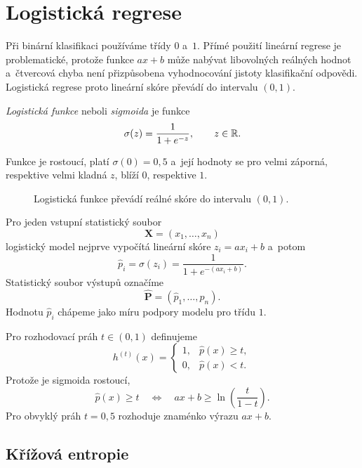 \section{Logistická regrese}\label{sec:ai-logisticka-regrese}

Při binární klasifikaci používáme třídy \(0\) a~\(1\). Přímé použití lineární regrese je problematické, protože funkce \(ax+b\) může nabývat libovolných reálných hodnot a~čtvercová chyba není přizpůsobena vyhodnocování jistoty klasifikační odpovědi. Logistická regrese proto lineární skóre převádí do intervalu \((0,1)\).

\begin{definition}\label{def:ai-sigmoida}
    \emph{Logistická funkce} neboli \emph{sigmoida} je funkce
    \[
        \sigma(z)
        =
        \frac{1}{1+e^{-z}},
        \qquad z\in\mathbb{R}.
    \]
\end{definition}

Funkce je rostoucí, platí \(\sigma(0)=0{,}5\) a~její hodnoty se pro velmi záporná, respektive velmi kladná \(z\), blíží \(0\), respektive \(1\).

\begin{figure}[ht]
    \centering
    
    \caption{Logistická funkce převádí reálné skóre do intervalu \((0,1)\).}
    \label{fig:ai-sigmoida}
\end{figure}

Pro jeden vstupní statistický soubor
\[
    \mathbf{X}=(x_1,\ldots,x_n)
\]
logistický model nejprve vypočítá lineární skóre \(z_i=ax_i+b\) a~potom
\[
    \hat p_i
    =
    \sigma(z_i)
    =
    \frac{1}{1+e^{-(ax_i+b)}}.
\]
Statistický soubor výstupů označíme
\[
    \hat{\mathbf{P}}
    =
    (\hat p_1,\ldots,\hat p_n).
\]
Hodnotu \(\hat p_i\) chápeme jako míru podpory modelu pro třídu \(1\).

Pro rozhodovací práh \(t\in(0,1)\) definujeme
\[
    h^{(t)}(x)
    =
    \begin{cases}
        1, & \hat p(x)\geqslant t,\\
        0, & \hat p(x)<t.
    \end{cases}
\]
Protože je sigmoida rostoucí,
\[
    \hat p(x)\geqslant t
    \quad\Longleftrightarrow\quad
    ax+b\geqslant
    \ln\left(\frac{t}{1-t}\right).
\]
Pro obvyklý práh \(t=0{,}5\) rozhoduje znaménko výrazu \(ax+b\).

\subsection{Křížová entropie}

